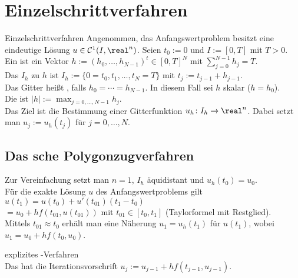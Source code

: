 \pagebreak

\section{%
    Einzelschrittverfahren%
}

\begin{Def}{Einzelschrittverfahren}
    Angenommen, das Anfangswertproblem besitzt eine eindeutige Lösung
    $u \in \C^1(I, \real^n)$.
    Seien $t_0 := 0$ und $I := [0, T]$ mit $T > 0$.\\
    Ein  ist ein Vektor
    $h := (h_0, \dotsc, h_{N-1})^t \in [0, T]^N$ mit
    $\sum_{j=0}^{N-1} h_j = T$.\\
    Das  $I_h$ zu $h$ ist
    $I_h := \{0 = t_0, t_1, \dotsc, t_N = T\}$ mit
    $t_j := t_{j-1} + h_{j-1}$.\\
    Das Gitter heißt , falls $h_0 = \dotsb = h_{N-1}$.
    In diesem Fall sei $h$ skalar ($h = h_0$).\\
    Die  ist $|h| := \max_{j=0,\dotsc,N-1} h_j$.\\
    Das Ziel ist die Bestimmung einer Gitterfunktion
    $u_h\colon I_h \rightarrow \real^n$.
    Dabei setzt man $u_j := u_h(t_j)$ für $j = 0, \dotsc, N$.
\end{Def}

\subsection{%
    Das sche Polygonzugverfahren%
}

\begin{Bem}
    Zur Vereinfachung setzt man $n = 1$,
    $I_h$ äquidistant und $u_h(t_0) = u_0$.\\
    Für die exakte Lösung $u$ des Anfangswertproblems gilt
    $u(t_1) = u(t_0) + u'(t_{01}) (t_1 - t_0)$\\
    $= u_0 + h f(t_{01}, u(t_{01}))$
    mit $t_{01} \in [t_0, t_1]$ (Taylorformel mit Restglied).\\
    Mittels $t_{01} \approx t_0$ erhält man eine Näherung
    $u_1 = u_h(t_1)$ für $u(t_1)$, wobei
    $u_1 = u_0 + h f(t_0, u_0)$.
\end{Bem}

\begin{Def}{explizites -Verfahren}\\
    Das  hat die Iterationsvorschrift
    $u_j := u_{j-1} + h f(t_{j-1}, u_{j-1})$.
\end{Def}

